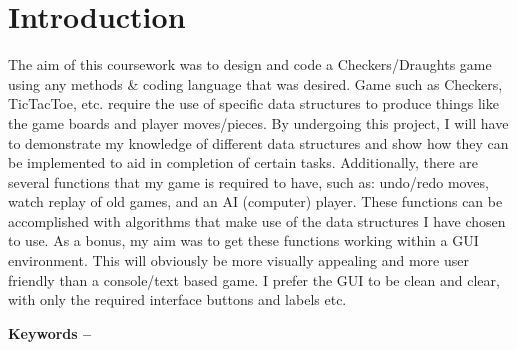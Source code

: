 \documentclass[10pt, a4paper]{article}
\title{\mytitle}
\author{\myauthor\hspace{1em}\\\contact\\Edinburgh Napier University\hspace{0.5em}-\hspace{0.5em}\mymodule}
\date{}
\begin{document}
    \maketitle
\section{Introduction}
The aim of this coursework was to design and code a Checkers/Draughts game using any methods \& coding language that was desired.
\newline
\newline
Game such as Checkers, TicTacToe, etc. require the use of specific data structures to produce things like the game boards and player moves/pieces.
By undergoing this project, I will have to demonstrate my knowledge of different data structures and show how they can be implemented to aid in completion of certain tasks.
\newline
\newline
Additionally, there are several functions that my game is required to have, such as: undo/redo moves, watch replay of old games, and an AI (computer) player.
These functions can be accomplished with algorithms that make use of the data structures I have chosen to use.
\newline
\newline
As a bonus, my aim was to get these functions working within a GUI environment. This will obviously be more visually appealing and more user friendly than a console/text based game.
I prefer the GUI to be clean and clear, with only the required interface buttons and labels etc.

\textbf{Keywords -- }{\mykeywords}
    
\end{document}
